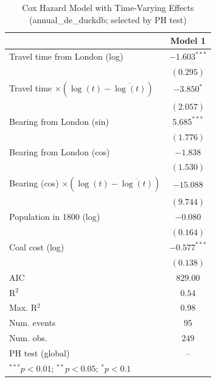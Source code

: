 
\begin{table}
\begin{center}
\begin{tabular}{l c}
\hline
 & Model 1 \\
\hline
Travel time from London (log) & $-1.603^{***}$ \\
 & $(0.295)$ \\
Travel time $\times (\log(t)-\overline{\log(t)})$ & $-3.850^{*}$ \\
 & $(2.057)$ \\
Bearing from London (sin) & $5.685^{***}$ \\
 & $(1.776)$ \\
Bearing from London (cos) & $-1.838$ \\
 & $(1.530)$ \\
Bearing (cos) $\times (\log(t)-\overline{\log(t)})$ & $-15.088$ \\
 & $(9.744)$ \\
Population in 1800 (log) & $-0.080$ \\
 & $(0.164)$ \\
Coal cost (log) & $-0.577^{***}$ \\
 & $(0.138)$ \\
\hline
AIC              & $829.00$ \\
R$^2$            & $0.54$ \\
Max. R$^2$       & $0.98$ \\
Num. events      & $95$ \\
Num. obs.        & $249$ \\
PH test (global) & -- \\
\hline
\multicolumn{2}{l}{\scriptsize{$^{***}p<0.01$; $^{**}p<0.05$; $^{*}p<0.1$}}
\end{tabular}
\caption{Cox Hazard Model with Time-Varying Effects (annual\_de\_duckdb; selected by PH test)}
\label{tab:cox_serious_tv_annual_de_duckdb}
\end{center}
\end{table}
